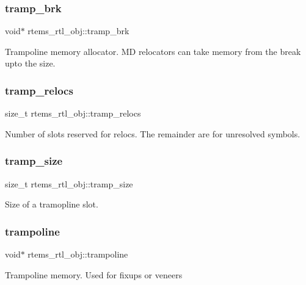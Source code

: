 \subsubsection{\texorpdfstring{tramp\_brk}{tramp\_brk}}
{\footnotesize\ttfamily void$\ast$ rtems\+\_\+rtl\+\_\+obj\+::tramp\+\_\+brk}

Trampoline memory allocator. MD relocators can take memory from the break upto the size. \mbox{\label{structrtems__rtl__obj_a253873bd4a2b00180aa5830ce9bed43c}} 
\subsubsection{\texorpdfstring{tramp\_relocs}{tramp\_relocs}}
{\footnotesize\ttfamily size\+\_\+t rtems\+\_\+rtl\+\_\+obj\+::tramp\+\_\+relocs}

Number of slots reserved for relocs. The remainder are for unresolved symbols. \mbox{\label{structrtems__rtl__obj_a8d66b3de8432ae75acc9a7c377519a9b}} 
\subsubsection{\texorpdfstring{tramp\_size}{tramp\_size}}
{\footnotesize\ttfamily size\+\_\+t rtems\+\_\+rtl\+\_\+obj\+::tramp\+\_\+size}

Size of a tramopline slot. \mbox{\label{structrtems__rtl__obj_a50b0ecdf04468c2685b2f578b1632ec2}} 
\subsubsection{\texorpdfstring{trampoline}{trampoline}}
{\footnotesize\ttfamily void$\ast$ rtems\+\_\+rtl\+\_\+obj\+::trampoline}

Trampoline memory. Used for fixups or veneers \mbox{\label{structrtems__rtl__obj_a2ede787b31e48048590c979a8cf3b034}} 
